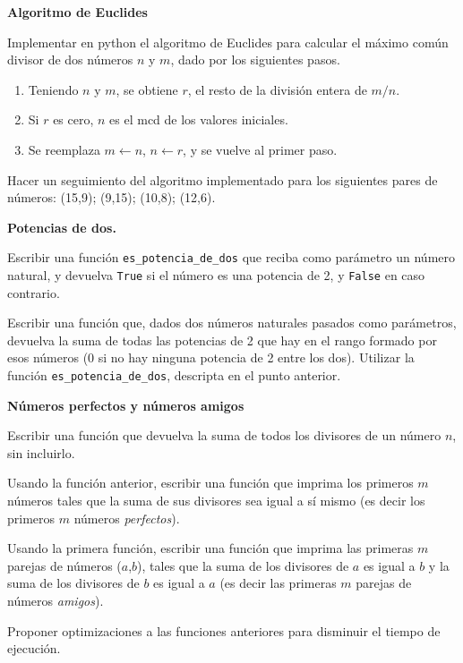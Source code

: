 \begin{ejercicio}
{\bf Algoritmo de Euclides}
\begin{partes}
    \item Implementar en python el algoritmo de Euclides para calcular el máximo
común divisor de dos números $n$ y $m$, dado por los siguientes pasos.
    \begin{enumerate}
        \item Teniendo $n$ y $m$, se obtiene $r$, el resto de la
división entera de $m/n$.
        \item Si $r$ es cero, $n$ es el mcd de los valores iniciales.
        \item Se reemplaza $m \leftarrow n$, $n \leftarrow r$, y se vuelve al
primer paso.
    \end{enumerate}
    \item Hacer un seguimiento del algoritmo implementado para los siguientes
pares de números: (15,9); (9,15); (10,8); (12,6).
\end{partes}
\end{ejercicio}

\begin{ejercicio}
{\bf Potencias de dos.}
\begin{partes}
    \item Escribir una función \verb!es_potencia_de_dos! que reciba como parámetro
un número natural, y devuelva \verb!True! si el número es una potencia de 2,
y \verb!False! en caso contrario.
    \item Escribir una función que, dados dos números naturales pasados como
parámetros, devuelva la suma de todas las potencias de 2 que hay en el
rango formado por esos números (0 si no hay ninguna potencia de 2 entre los
dos). Utilizar la función \verb!es_potencia_de_dos!, descripta en el
punto anterior.
\end{partes}
\end{ejercicio}


\begin{ejercicio}
{\bf Números perfectos y números amigos}
\begin{partes}
    \item Escribir una función que devuelva la suma de todos los divisores de
un número $n$, sin incluirlo.
    \item Usando la función anterior, escribir una función que imprima los
primeros $m$ números tales que la suma de sus divisores sea igual a sí
mismo (es decir los primeros $m$ números {\it perfectos}).
    \item Usando la primera función, escribir una función que imprima las
primeras $m$ parejas de números ($a$,$b$), tales que la suma de los
divisores de $a$ es igual a $b$ y la suma de los divisores de $b$ es igual
a $a$ (es decir las primeras $m$ parejas de números {\it amigos}).
    \item Proponer optimizaciones a las funciones anteriores para disminuir el
tiempo de ejecución.
\end{partes}
\end{ejercicio}

